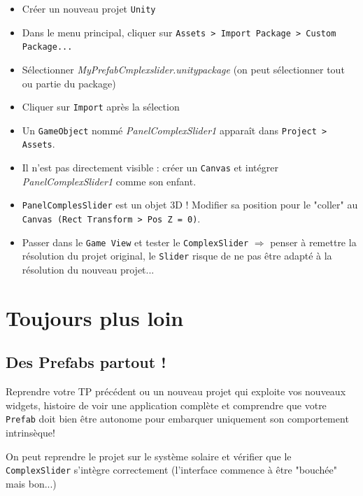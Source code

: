 \documentclass[a4paper,10pt]{article}
\newenvironment{solution}%
{\begin{tcolorbox}[breakable,colback=red!5!white,colframe=red!75!black,title=Solution]}%
{\end{tcolorbox}}
\begin{document}
\ifversionenseignant
\begin{solution}
	\begin{itemize}
		\item Créer un nouveau projet \texttt{Unity}
		\item Dans le menu principal, cliquer sur \texttt{Assets > Import Package > Custom Package...}
		\item Sélectionner \textit{MyPrefabCmplexslider.unitypackage} (on peut sélectionner tout ou partie du package)
		\item Cliquer sur \texttt{Import} après la sélection
		\item Un \texttt{GameObject} nommé \textit{PanelComplexSlider1} apparaît dans \texttt{Project > Assets}.		
		\item Il n'est pas directement visible : créer un \texttt{Canvas} et intégrer \textit{PanelComplexSlider1} comme son enfant.		
		\item \texttt{PanelComplesSlider} est un objet 3D ! Modifier sa position pour le "coller" au \texttt{Canvas (Rect Transform > Pos Z = 0)}.		
		\item Passer dans le \texttt{Game View} et tester le \texttt{ComplexSlider} $\Rightarrow$ penser à remettre la résolution du projet original, le \texttt{Slider} risque de ne pas être adapté à la résolution du nouveau projet...		
	\end{itemize}

\end{solution}
\fi 


\section{Toujours plus loin}

\subsection{Des Prefabs partout !}
Reprendre votre TP précédent ou un nouveau projet qui exploite vos nouveaux widgets, histoire de voir une application complète et comprendre que votre \texttt{Prefab} doit bien être autonome pour embarquer uniquement son comportement intrinsèque!

\ifversionenseignant
\begin{solution}
On peut reprendre le projet sur le système solaire et vérifier que le \texttt{ComplexSlider} s'intègre correctement (l'interface commence à être "bouchée" mais bon...)	
\end{solution}
\fi 
\end{document}
